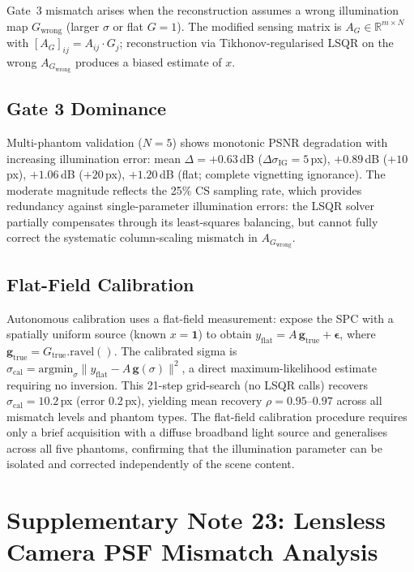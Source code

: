 \documentclass[11pt]{article}
\theoremstyle{definition}
\begin{document}
Gate~3 mismatch arises when the reconstruction assumes a wrong illumination map $G_\mathrm{wrong}$
(larger $\sigma$ or flat $G{=}1$). The modified sensing matrix is $A_G \in \mathbb{R}^{m \times N}$
with $[A_G]_{ij} = A_{ij} \cdot G_j$; reconstruction via Tikhonov-regularised LSQR on the wrong $A_{G_\mathrm{wrong}}$
produces a biased estimate of $x$.

\subsection{Gate 3 Dominance}
Multi-phantom validation ($N{=}5$) shows monotonic PSNR degradation with increasing illumination error:
mean $\Delta{=}+0.63$\,dB ($\Delta\sigma_\mathrm{IG}{=}5$\,px), $+0.89$\,dB ($+10$\,px), $+1.06$\,dB ($+20$\,px),
$+1.20$\,dB (flat; complete vignetting ignorance).
The moderate magnitude reflects the 25\% CS sampling rate, which provides redundancy against single-parameter
illumination errors: the LSQR solver partially compensates through its least-squares balancing, but cannot fully
correct the systematic column-scaling mismatch in $A_{G_\mathrm{wrong}}$.

\subsection{Flat-Field Calibration}
Autonomous calibration uses a flat-field measurement: expose the SPC with a spatially uniform source
(known $x{=}\mathbf{1}$) to obtain $y_\mathrm{flat} = A\,\mathbf{g}_\mathrm{true} + \boldsymbol{\epsilon}$,
where $\mathbf{g}_\mathrm{true} = G_\mathrm{true}.\mathrm{ravel}()$.
The calibrated sigma is $\sigma_\mathrm{cal} = \mathrm{argmin}_\sigma \|y_\mathrm{flat} - A\,\mathbf{g}(\sigma)\|^2$,
a direct maximum-likelihood estimate requiring no inversion.
This 21-step grid-search (no LSQR calls) recovers $\sigma_\mathrm{cal}{=}10.2$\,px (error 0.2\,px),
yielding mean recovery $\rho{=}0.95$--$0.97$ across all mismatch levels and phantom types.
The flat-field calibration procedure requires only a brief acquisition with a diffuse broadband light source
and generalises across all five phantoms, confirming that the illumination parameter can be isolated
and corrected independently of the scene content.


\section{Supplementary Note 23: Lensless Camera PSF Mismatch Analysis}
\label{sec:note_lensless}
\end{document}
